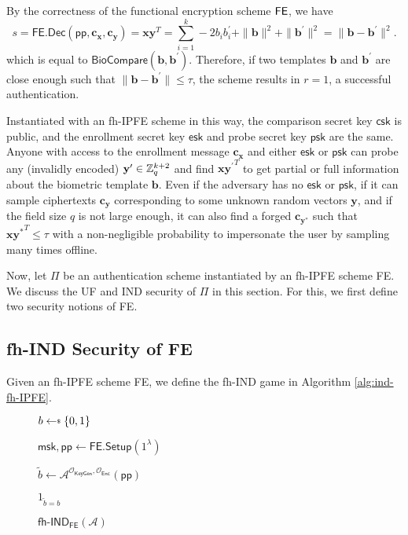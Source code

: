 By the correctness of the functional encryption scheme $\sf FE$, we have
\[
	s = \textsf{FE.Dec}(\textsf{pp}, \mathbf{c_x}, \mathbf{c_y}) =  \mathbf{x} \mathbf{y}^T = \sum_{i=1}^k -2b_ib_i^\prime + \|\mathbf{b}\|^2 + \|\mathbf{b}^\prime\|^2 = \| \mathbf{b} - \mathbf{b}^\prime \|^2.
\]
which is equal to $\textsf{BioCompare}(\mathbf{b}, \mathbf{b}^\prime)$. Therefore, if two templates $\mathbf{b}$ and $\mathbf{b}^\prime$ are close enough such that $\|\mathbf{b} - \mathbf{b}^\prime\| \leq \tau$, the scheme results in $r = 1$, a successful authentication.

Instantiated with an fh-IPFE scheme in this way, the comparison secret key $\textsf{csk}$ is public, and the enrollment secret key $\textsf{esk}$ and probe secret key $\textsf{psk}$ are the same. Anyone with access to the enrollment message $\mathbf{c_x}$ and either $\textsf{esk}$ or $\textsf{psk}$ can probe any (invalidly encoded) $\mathbf{y}^{\prime} \in \mathbb{Z}_q^{k+2}$ and find $\mathbf{x} {\mathbf{y}^\prime}^T$ to get partial or full information about the biometric template $\mathbf{b}$. Even if the adversary has no $\textsf{esk}$ or $\textsf{psk}$, if it can sample ciphertexts $\mathbf{c_{y}}$ corresponding to some unknown random vectors $\mathbf{y}$, and if the field size $q$ is not large enough, it can also find a forged $\mathbf{c_{y^*}}$ such that $\mathbf{x}\mathbf{y^*}^T \leq \tau$ with a non-negligible probability to impersonate the user by sampling many times offline.



Now, let $\Pi$ be an authentication scheme instantiated by an fh-IPFE scheme \textsf{FE}. We discuss the UF and IND security of $\Pi$ in this section. For this, we first define two security notions of \textsf{FE}.

\subsection{fh-IND Security of \textsf{FE}}

Given an fh-IPFE scheme \textsf{FE}, we define the \textsf{fh-IND} game \cite{cryptoeprint:2016/440} in Algorithm \ref{alg:ind-fh-IPFE}.

\begin{figure}[h]
\centering

	\begin{minipage}[t]{0.4\textwidth}
	\begin{algorithm}[H]
	\caption{$\textsf{fh-IND}_{\textsf{FE}}(\mathcal{A})$}
	\label{alg:ind-fh-IPFE}
	\begin{algorithmic}[1]
		\State $b \getsdollar \{0, 1\}$

		\State $\textsf{msk}, \textsf{pp} \gets \textsf{FE.Setup}(1^\lambda)$

		\State $\tilde{b} \gets \mathcal{A}^{\mathcal{O}_{\textsf{KeyGen}}, \mathcal{O}_{\textsf{Enc}}} ( \textsf{pp} )$

		\State \Return $1_{\tilde{b} = b}$
	\end{algorithmic}
	\end{algorithm}
	\end{minipage}

\label{fig:ind-fh-IPFE}
\end{figure}

